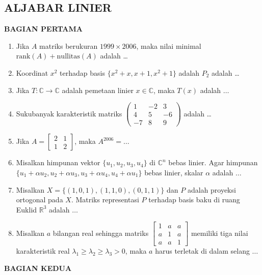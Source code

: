\documentclass[12pt,twoside]{article}
\begin{document}
\subsection{ALJABAR LINIER}
\textbf{BAGIAN PERTAMA}
\begin{enumerate}
	\item Jika $A$ matriks berukuran $1999\times 2006$, maka nilai minimal $\text{rank}(A)+\text{nullitas}(A)$ adalah \dots
	\item Koordinat $x^2$ terhadap basis $\{x^2+x, x+1, x^2+1\}$ adalah $P_2$ adalah \dots
	\item Jika $T:\mathbb{C}\to\mathbb{C} $ adalah pemetaan linier $x\in \mathbb{C}$, maka $T(x)$ adalah $\dots$
	\item Sukubanyak karakteristik matriks $\left(\begin{array}{rrr}
			      1 & -2 & 3 \\4&5&-6\\-7&8&9
		      \end{array}\right)$ adalah \dots
	\item Jika $A=\left[\begin{array}{rr}
				      2 & 1 \\1&2
			      \end{array}\right]$, maka $A^{2006}=\dots$
	\item Misalkan himpunan vektor $\{u_1,u_2,u_3,u_4 \}$ di $\mathbb{C}^n$ bebas linier. Agar himpunan $\{u_1+\alpha u_2,u_2+\alpha u_3,u_3+\alpha u_4,u_4+\alpha u_1 \}$ bebas linier, skalar $\alpha$ adalah $\dots$
	\item Misalkan $X=\{(1,0,1),(1,1,0),(0,1,1) \}$ dan $P$ adalah proyeksi ortogonal pada $X$. Matriks representasi $P$ terhadap basis baku di ruang Euklid $\mathbb{R}^3$ adalah $\dots$
	\item Misalkan $a$ bilangan real sehingga matriks $\left[ \begin{array}{ccc}
				      1 & a & a \\a&1&a\\a&a&1
			      \end{array}\right]$ memiliki tiga nilai karakteristik real $\lambda_1\geq \lambda_2\geq \lambda_3>0$, maka $a$ harus terletak di dalam selang $\dots$

\end{enumerate}
\newpage
\newpage \textbf{BAGIAN KEDUA}
\end{document}
